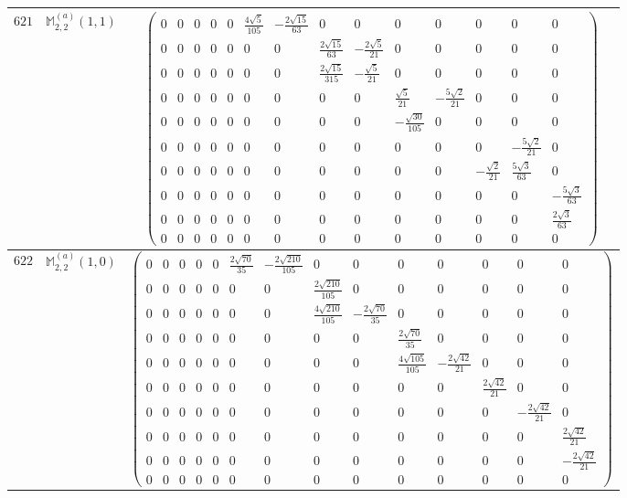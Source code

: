 \documentclass[fleqn,8pt,landscape]{jsarticle}
\begin{document}
\begin{center}
\begin{longtable}{ccc}
$ 621 $ & $ \mathbb{M}_{2,2}^{(a)}(1,1) $ & $ \begin{pmatrix} 0 & 0 & 0 & 0 & 0 & \frac{4 \sqrt{5}}{105} & - \frac{2 \sqrt{15}}{63} & 0 & 0 & 0 & 0 & 0 & 0 & 0 \\ 0 & 0 & 0 & 0 & 0 & 0 & 0 & \frac{2 \sqrt{15}}{63} & - \frac{2 \sqrt{5}}{21} & 0 & 0 & 0 & 0 & 0 \\ 0 & 0 & 0 & 0 & 0 & 0 & 0 & \frac{2 \sqrt{15}}{315} & - \frac{\sqrt{5}}{21} & 0 & 0 & 0 & 0 & 0 \\ 0 & 0 & 0 & 0 & 0 & 0 & 0 & 0 & 0 & \frac{\sqrt{5}}{21} & - \frac{5 \sqrt{2}}{21} & 0 & 0 & 0 \\ 0 & 0 & 0 & 0 & 0 & 0 & 0 & 0 & 0 & - \frac{\sqrt{30}}{105} & 0 & 0 & 0 & 0 \\ 0 & 0 & 0 & 0 & 0 & 0 & 0 & 0 & 0 & 0 & 0 & 0 & - \frac{5 \sqrt{2}}{21} & 0 \\ 0 & 0 & 0 & 0 & 0 & 0 & 0 & 0 & 0 & 0 & 0 & - \frac{\sqrt{2}}{21} & \frac{5 \sqrt{3}}{63} & 0 \\ 0 & 0 & 0 & 0 & 0 & 0 & 0 & 0 & 0 & 0 & 0 & 0 & 0 & - \frac{5 \sqrt{3}}{63} \\ 0 & 0 & 0 & 0 & 0 & 0 & 0 & 0 & 0 & 0 & 0 & 0 & 0 & \frac{2 \sqrt{3}}{63} \\ 0 & 0 & 0 & 0 & 0 & 0 & 0 & 0 & 0 & 0 & 0 & 0 & 0 & 0 \end{pmatrix} $ \\ \hline
$ 622 $ & $ \mathbb{M}_{2,2}^{(a)}(1,0) $ & $ \begin{pmatrix} 0 & 0 & 0 & 0 & 0 & \frac{2 \sqrt{70}}{35} & - \frac{2 \sqrt{210}}{105} & 0 & 0 & 0 & 0 & 0 & 0 & 0 \\ 0 & 0 & 0 & 0 & 0 & 0 & 0 & \frac{2 \sqrt{210}}{105} & 0 & 0 & 0 & 0 & 0 & 0 \\ 0 & 0 & 0 & 0 & 0 & 0 & 0 & \frac{4 \sqrt{210}}{105} & - \frac{2 \sqrt{70}}{35} & 0 & 0 & 0 & 0 & 0 \\ 0 & 0 & 0 & 0 & 0 & 0 & 0 & 0 & 0 & \frac{2 \sqrt{70}}{35} & 0 & 0 & 0 & 0 \\ 0 & 0 & 0 & 0 & 0 & 0 & 0 & 0 & 0 & \frac{4 \sqrt{105}}{105} & - \frac{2 \sqrt{42}}{21} & 0 & 0 & 0 \\ 0 & 0 & 0 & 0 & 0 & 0 & 0 & 0 & 0 & 0 & 0 & \frac{2 \sqrt{42}}{21} & 0 & 0 \\ 0 & 0 & 0 & 0 & 0 & 0 & 0 & 0 & 0 & 0 & 0 & 0 & - \frac{2 \sqrt{42}}{21} & 0 \\ 0 & 0 & 0 & 0 & 0 & 0 & 0 & 0 & 0 & 0 & 0 & 0 & 0 & \frac{2 \sqrt{42}}{21} \\ 0 & 0 & 0 & 0 & 0 & 0 & 0 & 0 & 0 & 0 & 0 & 0 & 0 & - \frac{2 \sqrt{42}}{21} \\ 0 & 0 & 0 & 0 & 0 & 0 & 0 & 0 & 0 & 0 & 0 & 0 & 0 & 0 \end{pmatrix} $ \\ \hline

\end{longtable}
\end{center}
\end{document}
